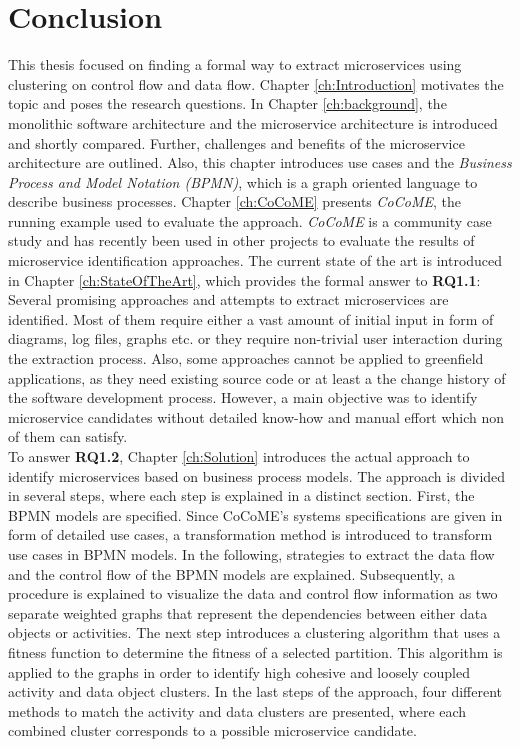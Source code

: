 \chapter{Conclusion}
\label{ch:Conclusion}
This thesis focused on finding a formal way to extract microservices using clustering on control flow and data flow. Chapter \ref{ch:Introduction} motivates the topic and poses the research questions. In Chapter \ref{ch:background}, the monolithic software architecture and the microservice architecture is introduced and shortly compared. Further, challenges and benefits of the microservice architecture are outlined. Also, this chapter introduces use cases and the \textit{Business Process and Model Notation (BPMN)}, which is a graph oriented language to describe business processes. Chapter \ref{ch:CoCoME} presents \textit{CoCoME}, the running example used to evaluate the approach. \textit{CoCoME} is a community case study and has recently been used in other projects to evaluate the results of microservice identification approaches. The current state of the art is introduced in Chapter \ref{ch:StateOfTheArt}, which provides the formal answer to \textbf{RQ1.1}: Several promising approaches and attempts to extract microservices are identified. Most of them require either a vast amount of initial input in form of diagrams, log files, graphs etc. or they require non-trivial user interaction during the extraction process. Also, some approaches cannot be applied to greenfield applications, as they need existing source code or at least a the change history of the software development process. However, a main objective was to identify microservice candidates without detailed know-how and manual effort which non of them can satisfy. \\
To answer \textbf{RQ1.2}, Chapter \ref{ch:Solution} introduces the actual approach to identify microservices based on business process models.  The approach is divided in several steps, where each step is explained in a distinct section. First, the BPMN models are specified. Since CoCoME's systems specifications are given in form of detailed use cases, a transformation method is introduced to transform use cases in BPMN models. In the following, strategies to extract the data flow and the control flow of the BPMN models are explained. Subsequently, a procedure is explained to visualize the data and control flow information as two separate weighted graphs that represent the dependencies between either data objects or activities. The next step introduces a clustering algorithm that uses a fitness function to determine the fitness of a selected partition. This algorithm is applied to the graphs in order to identify high cohesive and loosely coupled activity and data object clusters. In the last steps of the approach, four different methods to match the activity and data clusters are presented, where each combined cluster corresponds to a possible microservice candidate. \\
